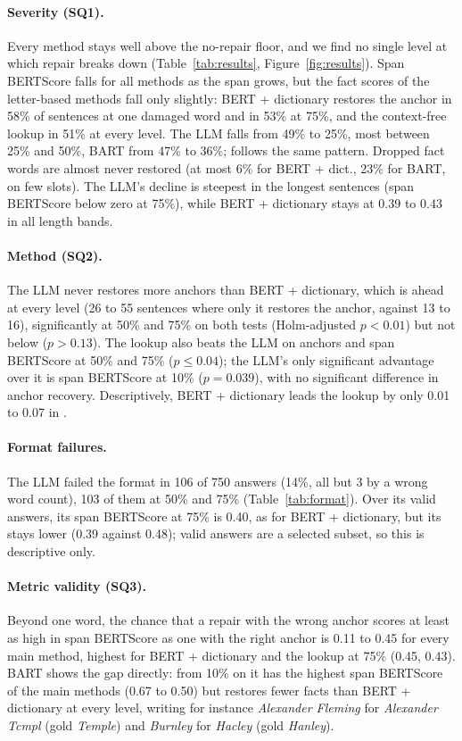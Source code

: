 

\paragraph{Severity (SQ1).} Every method stays well above the no-repair floor, and we find no single level at
which repair breaks down (Table~\ref{tab:results}, Figure~\ref{fig:results}). Span BERTScore falls for all methods as the span grows,
but the fact scores of the letter-based methods fall only slightly: BERT + dictionary restores the anchor in 58\% of
sentences at one damaged word and in 53\% at 75\%, and the context-free lookup in 51\% at every level. The LLM falls
from 49\% to 25\%, most between 25\% and 50\%, BART from 47\% to 36\%; \frr{} follows the same pattern. Dropped fact words are almost never
restored (at most 6\% for BERT + dict., 23\% for BART, on few slots). The LLM's decline is steepest in the longest
sentences (span BERTScore below zero at 75\%), while BERT + dictionary stays at 0.39 to 0.43 in all length bands.

\paragraph{Method (SQ2).} The LLM never restores more anchors than BERT + dictionary, which is ahead at every level
(26 to 55 sentences where only it restores the anchor, against 13 to 16), significantly at 50\% and 75\% on both
tests (Holm-adjusted $p < 0.01$) but not below ($p > 0.13$). The lookup also beats the LLM on anchors and span
BERTScore at 50\% and 75\% ($p \le 0.04$); the LLM's only significant advantage over it is span BERTScore at 10\%
($p = 0.039$), with no significant difference in anchor recovery. Descriptively, BERT + dictionary leads the lookup by only 0.01 to
0.07 in \frr{}.

\paragraph{Format failures.} The LLM failed the format in 106 of 750 answers (14\%, all but 3 by a wrong word count), 103 of them at
50\% and 75\% (Table~\ref{tab:format}). Over its valid answers, its span BERTScore at 75\% is 0.40, as for BERT +
dictionary, but its \frr{} stays lower (0.39 against 0.48); valid answers are a selected subset, so this is
descriptive only.

\paragraph{Metric validity (SQ3).} Beyond one word, the chance that a repair with the wrong anchor scores at least
as high in span BERTScore as one with the right anchor is 0.11 to 0.45 for every main method, highest for BERT +
dictionary and the lookup at 75\% (0.45, 0.43). BART shows the gap directly:
from 10\% on it has the highest span BERTScore of the main methods (0.67 to 0.50) but restores fewer facts than BERT
+ dictionary at every level, writing for instance \emph{Alexander Fleming} for \emph{Alexander Tcmpl} (gold
\emph{Temple}) and \emph{Burnley} for \emph{Hacley} (gold \emph{Hanley}).

